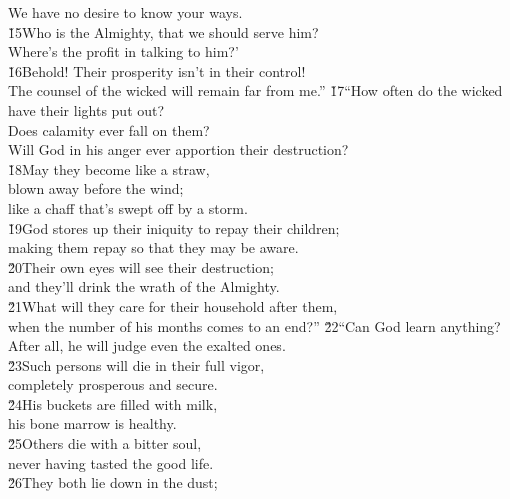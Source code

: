 \begin{poetry}
\poemll    We have no desire to know your ways. \\
\poeml \v{15}Who is the Almighty, that we should serve him? \\
\poemll    Where's the profit in talking to him?' \\
\poeml \v{16}Behold! Their prosperity isn't in their control! \\
\poemll    The counsel of the wicked will remain far from me.''
\poeml \v{17}``How often do the wicked have their lights put out? \\
\poemll    Does calamity ever fall on them? \\
\poemlll       Will God in his anger ever apportion their destruction? \\
\poeml \v{18}May they become like a straw, \\
\poemll    blown away before the wind; \\
\poemlll       like a chaff that's swept off by a storm. \\
\poeml \v{19}God stores up their iniquity to repay their children; \\
\poemll    making them repay so that they may be aware. \\
\poeml \v{20}Their own eyes will see their destruction; \\
\poemll    and they'll drink the wrath of the Almighty. \\
\poeml \v{21}What will they care for their household after them, \\
\poemll    when the number of his months comes to an end?''
\poeml \v{22}``Can God learn anything? \\
\poemll    After all, he will judge even the exalted ones. \\
\poeml \v{23}Such persons will die in their full vigor, \\
\poemll    completely prosperous and secure. \\
\poeml \v{24}His buckets are filled with milk, \\
\poemll    his bone marrow is healthy. \\
\poeml \v{25}Others die with a bitter soul, \\
\poemll    never having tasted the good life. \\
\poeml \v{26}They both lie down in the dust; \\

\end{poetry}

